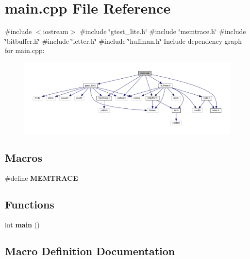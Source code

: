 \section{main.\+cpp File Reference}
\label{main_8cpp}
{\ttfamily \#include $<$iostream$>$}\newline
{\ttfamily \#include \char`\"{}gtest\+\_\+lite.\+h\char`\"{}}\newline
{\ttfamily \#include \char`\"{}memtrace.\+h\char`\"{}}\newline
{\ttfamily \#include \char`\"{}bitbuffer.\+h\char`\"{}}\newline
{\ttfamily \#include \char`\"{}letter.\+h\char`\"{}}\newline
{\ttfamily \#include \char`\"{}huffman.\+h\char`\"{}}\newline
Include dependency graph for main.\+cpp\+:
\nopagebreak
\begin{figure}[H]
\begin{center}
\leavevmode
\includegraphics[width=350pt]{main_8cpp__incl}
\end{center}
\end{figure}
\subsection*{Macros}
\begin{DoxyCompactItemize}
\item 
\#define \textbf{ M\+E\+M\+T\+R\+A\+CE}
\end{DoxyCompactItemize}
\subsection*{Functions}
\begin{DoxyCompactItemize}
\item 
int \textbf{ main} ()
\end{DoxyCompactItemize}


\subsection{Macro Definition Documentation}
\mbox{\label{main_8cpp_aa90f3e89fc3fe477370afb9f81975081}} 
